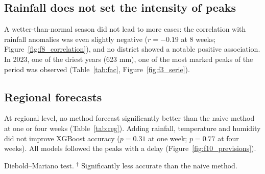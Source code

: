 \documentclass[11pt]{article}
\begin{document}
\subsection{Rainfall does not set the intensity of peaks}
A wetter-than-normal season did not lead to more cases: the correlation with rainfall anomalies was even slightly negative ($r=-0.19$ at 8 weeks; Figure~\ref{fig:f8_correlation}), and no district showed a notable positive association. In 2023, one of the driest years (623 mm), one of the most marked peaks of the period was observed (Table~\ref{tab:fac}, Figure~\ref{fig:f3_serie}).

\subsection{Regional forecasts}
At regional level, no method forecast significantly better than the naive method at one or four weeks (Table~\ref{tab:reg}). Adding rainfall, temperature and humidity did not improve XGBoost accuracy ($p=0.31$ at one week; $p=0.77$ at four weeks). All models followed the peaks with a delay (Figure~\ref{fig:f10_previsions}).

\begin{table}[!htbp]\centering\small
\caption{Accuracy of regional forecasts, 2023–2025 (156 weeks at one week, 153 at four weeks). MAE and RMSE in cases per week.}\label{tab:reg}
\par\smallskip\raggedright Diebold–Mariano test. $^{\dagger}$ Significantly less accurate than the naive method.
\end{table}
\end{document}
